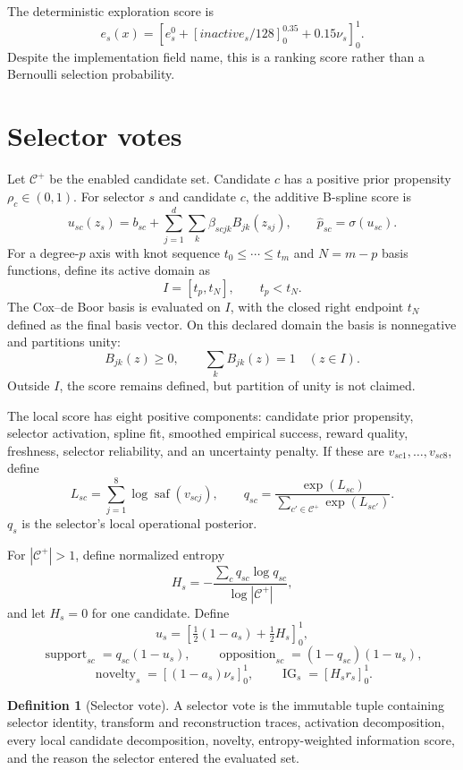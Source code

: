 \documentclass[11pt]{article}
\theoremstyle{definition}
\newtheorem{definition}{Definition}[section]
\theoremstyle{plain}
\newcommand{\clip}[3]{\left[#1\right]_{#2}^{#3}}
\begin{document}
The deterministic exploration score is
\[
e_s(x)=\clip{
e_s^0+\clip{inactive_s/128}{0}{0.35}+0.15\nu_s
}{0}{1}.
\]
Despite the implementation field name, this is a ranking score rather than a
Bernoulli selection probability.

\section{Selector votes}

Let $\mathcal C^+$ be the enabled candidate set.  Candidate $c$ has a positive
prior propensity $\rho_c\in(0,1)$.  For selector $s$ and candidate $c$, the
additive B-spline score is
\[
u_{sc}(z_s)=b_{sc}
+\sum_{j=1}^{d}\sum_k\beta_{scjk}B_{jk}(z_{sj}),
\qquad
\widehat p_{sc}=\sigma(u_{sc}).
\]
For a degree-$p$ axis with knot sequence
$t_0\le\cdots\le t_m$ and $N=m-p$ basis functions, define its active domain as
\[
 I=[t_p,t_N],\qquad t_p<t_N.
\]
The Cox--de Boor basis is evaluated on $I$, with the closed right endpoint
$t_N$ defined as the final basis vector.  On this declared domain the basis is
nonnegative and partitions unity:
\[
 B_{jk}(z)\ge0,\qquad \sum_k B_{jk}(z)=1
 \quad(z\in I).
\]
Outside $I$, the score remains defined, but partition of unity is not claimed.

The local score has eight positive components:
candidate prior propensity, selector activation, spline fit, smoothed
empirical success, reward quality, freshness, selector reliability, and an
uncertainty penalty.  If these are $v_{sc1},\ldots,v_{sc8}$, define
\[
L_{sc}=\sum_{j=1}^{8}\log\operatorname{saf}(v_{scj}),
\qquad
q_{sc}=\frac{\exp(L_{sc})}
{\sum_{c'\in\mathcal C^+}\exp(L_{sc'})}.
\]
$q_s$ is the selector's local operational posterior.

For $|\mathcal C^+|>1$, define normalized entropy
\[
H_s=-\frac{\sum_c q_{sc}\log q_{sc}}{\log|\mathcal C^+|},
\]
and let $H_s=0$ for one candidate.  Define
\[
u_s=\clip{\tfrac12(1-a_s)+\tfrac12H_s}{0}{1},
\]
\[
\operatorname{support}_{sc}=q_{sc}(1-u_s),\qquad
\operatorname{opposition}_{sc}=(1-q_{sc})(1-u_s),
\]
\[
\operatorname{novelty}_s=\clip{(1-a_s)\nu_s}{0}{1},
\qquad
\operatorname{IG}_s=\clip{H_s r_s}{0}{1}.
\]

\begin{definition}[Selector vote]
A selector vote is the immutable tuple containing selector identity,
transform and reconstruction traces, activation decomposition, every local
candidate decomposition, novelty, entropy-weighted information score, and the
reason the selector entered the evaluated set.
\end{definition}
\end{document}
